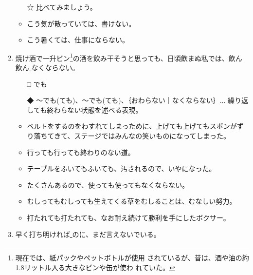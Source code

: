 \documentclass[
uplatex,
b5paper,
10pt,
dvipdfmx
]{jsbook}
\begin{document}
\begin{enumerate}
\begin{itemize}
  \item[☆] 比べてみましょう。
\end{itemize}

\begin{itemize}
 \item こう気が散っていては、書けない。
 \item こう暑くては、仕事にならない。
\end{itemize}

 \item 焼け酒で一升ビン\footnote{現在では、紙パックやペットボトルが使用
       されているが、昔は、酒や油の約1.8リットル入る大きなビンや缶が使わ
       れていた。}の酒を飲み干そうと思っても、日頃飲まぬ私では、飲ん
       \underline{   }飲ん\underline{   }なくならない。

 \begin{itemize}
  \item[□] でも
  \item[◆] 〜でも(ても)、〜でも(ても)、｛おわらない｜なくならない｝...
	    繰り返しても終わらない状態を述べる表現。
 \end{itemize}

\begin{itemize}
 \item ベルトをするのをわすれてしまっために、上げても上げてもスボンがず
       り落ちてきて、ステージではみんなの笑いものになってしまった。
 \item 行っても行っても終わりのない道。
 \item テーブルをふいてもふいても、汚されるので、いやになった。
 \item たくさんあるので、使っても使ってもなくならない。
 \item むしってもむしっても生えてくる草をむしることは、むなしい努力。
 \item 打たれても打たれても、なお耐え続けて勝利を手にしたボクサー。
\end{itemize}

 \item 早く打ち明ければ\underline{   }のに、まだ言えないでいる。


\end{enumerate}
\end{document}
